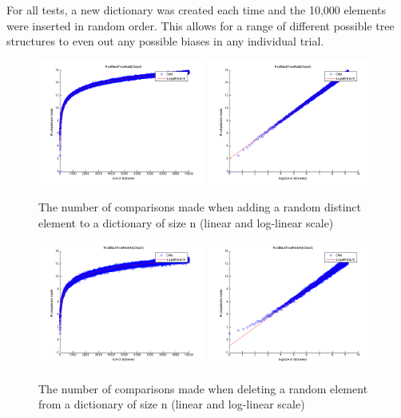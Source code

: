 For all tests, a new dictionary was created each time and the 10,000 elements were inserted in random order. This allows for a range of different possible tree structures to even out any possible biases in any individual trial.

\begin{figure}[!htbpp]
    \centering
    \includegraphics[width=0.49\textwidth]{resources/add}
    \includegraphics[width=0.49\textwidth]{resources/add_log}
    \caption{The number of comparisons made when adding a random distinct element to a dictionary of size n (linear and log-linear scale)}

\end{figure}

\begin{figure}[!htbp]
    \centering
    \includegraphics[width=0.49\textwidth]{resources/del}
    \includegraphics[width=0.49\textwidth]{resources/del_log}
    \caption{The number of comparisons made when deleting a random element from a dictionary of size n (linear and log-linear scale)}
\end{figure}

